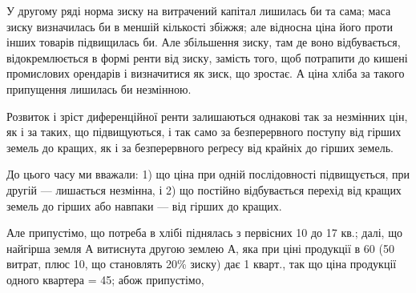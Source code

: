 У другому ряді норма зиску на витрачений капітал лишилась би та
сама; маса зиску визначилась би в меншій кількості збіжжя; але відносна ціна
його проти інших товарів підвищилась би. Але збільшення зиску, там де воно
відбувається, відокремлюється в формі ренти від зиску, замість того, щоб потрапити
до кишені промислових орендарів і визначитися як зиск, що зростає.
А ціна хліба за такого припущення лишилась би незмінною.

Розвиток і зріст диференційної ренти залишаються однакові так за незмінних
цін, як і за таких, що підвищуються, і так само за безперервного поступу
від гірших земель до кращих, як і за безперервного реґресу від крайніх
до гірших земель.

До цього часу ми вважали: 1) що ціна при одній послідовності підвищується,
при другій — лишається незмінна, і 2) що постійно відбувається перехід
від кращих земель до гірших або навпаки — від гірших до кращих.

Але припустімо, що потреба в хлібі піднялась з первісних 10 до 17 кв.;
далі, що найгірша земля $А$ витиснута другою землею $А$, яка при ціні продукції
в 60 (50 витрат, плюс 10, що становлять 20\% зиску) дає
1 кварт., так що ціна продукції одного квартера = 45; абож припустімо,
\parbreak{}  %
